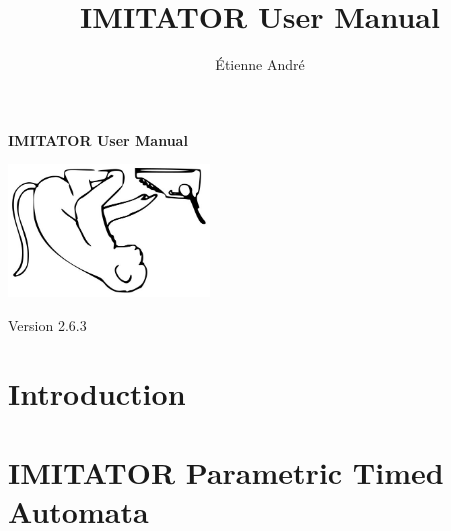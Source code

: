\documentclass[a4paper,11pt]{article}
\title{IMITATOR User Manual}
\author{Étienne André}
\newcommand{\imitator}{\textsc{Imitator}}
\newcommand{\imitatorversion}{2.6.3}
\begin{document}
\mbox{}

\thispagestyle{empty}

\vspace{5cm}

\begin{center}
	{\Huge \bfseries IMITATOR User Manual}

	\vspace{2cm}

	\includegraphics[width=0.40\textwidth]{include/logo.jpg}

	\vspace{2cm}
	
	{\Large Version \imitatorversion{}}

\end{center}

\bigskip


\newpage

\tableofcontents
{}

\newpage




\section{Introduction}


\section{IMITATOR Parametric Timed Automata}
\end{document}
